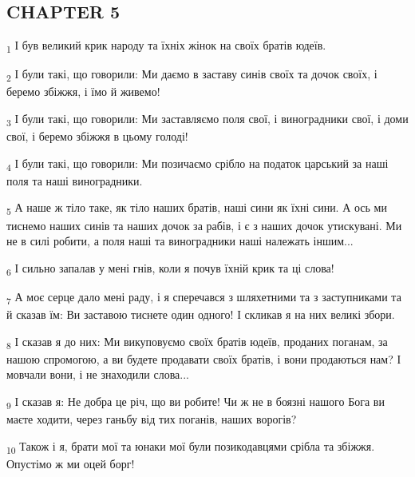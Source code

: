 \subsection{CHAPTER 5}
\begin{tcolorbox}
\textsubscript{1} І був великий крик народу та їхніх жінок на своїх братів юдеїв.
\end{tcolorbox}
\begin{tcolorbox}
\textsubscript{2} І були такі, що говорили: Ми даємо в заставу синів своїх та дочок своїх, і беремо збіжжя, і їмо й живемо!
\end{tcolorbox}
\begin{tcolorbox}
\textsubscript{3} І були такі, що говорили: Ми заставляємо поля свої, і виноградники свої, і доми свої, і беремо збіжжя в цьому голоді!
\end{tcolorbox}
\begin{tcolorbox}
\textsubscript{4} І були такі, що говорили: Ми позичаємо срібло на податок царський за наші поля та наші виноградники.
\end{tcolorbox}
\begin{tcolorbox}
\textsubscript{5} А наше ж тіло таке, як тіло наших братів, наші сини як їхні сини. А ось ми тиснемо наших синів та наших дочок за рабів, і є з наших дочок утискувані. Ми не в силі робити, а поля наші та виноградники наші належать іншим...
\end{tcolorbox}
\begin{tcolorbox}
\textsubscript{6} І сильно запалав у мені гнів, коли я почув їхній крик та ці слова!
\end{tcolorbox}
\begin{tcolorbox}
\textsubscript{7} А моє серце дало мені раду, і я сперечався з шляхетними та з заступниками та й сказав їм: Ви заставою тиснете один одного! І скликав я на них великі збори.
\end{tcolorbox}
\begin{tcolorbox}
\textsubscript{8} І сказав я до них: Ми викуповуємо своїх братів юдеїв, проданих поганам, за нашою спромогою, а ви будете продавати своїх братів, і вони продаються нам? І мовчали вони, і не знаходили слова...
\end{tcolorbox}
\begin{tcolorbox}
\textsubscript{9} І сказав я: Не добра це річ, що ви робите! Чи ж не в боязні нашого Бога ви маєте ходити, через ганьбу від тих поганів, наших ворогів?
\end{tcolorbox}
\begin{tcolorbox}
\textsubscript{10} Також і я, брати мої та юнаки мої були позикодавцями срібла та збіжжя. Опустімо ж ми оцей борг!
\end{tcolorbox}
